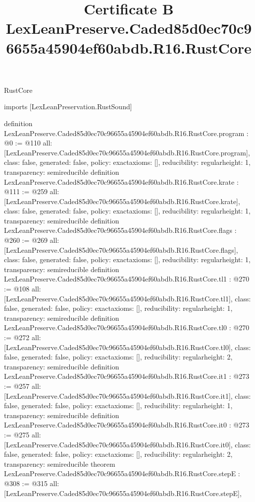 \begin{lexlean}{RustCore}
\title{Certificate B LexLeanPreserve.Caded85d0ec70c96655a45904ef60abdb.R16.RustCore}
\begin{coremodule}
imports [LexLeanPreservation.RustSound]

definition LexLeanPreserve.Caded85d0ec70c96655a45904ef60abdb.R16.RustCore.program : @0 := @110 {
  all: [LexLeanPreserve.Caded85d0ec70c96655a45904ef60abdb.R16.RustCore.program],
  class: false,
  generated: false,
  policy: exact{axioms: []},
  reducibility: regular{height: 1},
  transparency: semireducible
}
definition LexLeanPreserve.Caded85d0ec70c96655a45904ef60abdb.R16.RustCore.krate : @111 := @259 {
  all: [LexLeanPreserve.Caded85d0ec70c96655a45904ef60abdb.R16.RustCore.krate],
  class: false,
  generated: false,
  policy: exact{axioms: []},
  reducibility: regular{height: 1},
  transparency: semireducible
}
definition LexLeanPreserve.Caded85d0ec70c96655a45904ef60abdb.R16.RustCore.flags : @260 := @269 {
  all: [LexLeanPreserve.Caded85d0ec70c96655a45904ef60abdb.R16.RustCore.flags],
  class: false,
  generated: false,
  policy: exact{axioms: []},
  reducibility: regular{height: 1},
  transparency: semireducible
}
definition LexLeanPreserve.Caded85d0ec70c96655a45904ef60abdb.R16.RustCore.tl1 : @270 := @108 {
  all: [LexLeanPreserve.Caded85d0ec70c96655a45904ef60abdb.R16.RustCore.tl1],
  class: false,
  generated: false,
  policy: exact{axioms: []},
  reducibility: regular{height: 1},
  transparency: semireducible
}
definition LexLeanPreserve.Caded85d0ec70c96655a45904ef60abdb.R16.RustCore.tl0 : @270 := @272 {
  all: [LexLeanPreserve.Caded85d0ec70c96655a45904ef60abdb.R16.RustCore.tl0],
  class: false,
  generated: false,
  policy: exact{axioms: []},
  reducibility: regular{height: 2},
  transparency: semireducible
}
definition LexLeanPreserve.Caded85d0ec70c96655a45904ef60abdb.R16.RustCore.it1 : @273 := @257 {
  all: [LexLeanPreserve.Caded85d0ec70c96655a45904ef60abdb.R16.RustCore.it1],
  class: false,
  generated: false,
  policy: exact{axioms: []},
  reducibility: regular{height: 1},
  transparency: semireducible
}
definition LexLeanPreserve.Caded85d0ec70c96655a45904ef60abdb.R16.RustCore.it0 : @273 := @275 {
  all: [LexLeanPreserve.Caded85d0ec70c96655a45904ef60abdb.R16.RustCore.it0],
  class: false,
  generated: false,
  policy: exact{axioms: []},
  reducibility: regular{height: 2},
  transparency: semireducible
}
theorem LexLeanPreserve.Caded85d0ec70c96655a45904ef60abdb.R16.RustCore.stepE : @308 := @315 {
  all: [LexLeanPreserve.Caded85d0ec70c96655a45904ef60abdb.R16.RustCore.stepE],
}
\end{coremodule}
\end{lexlean}
